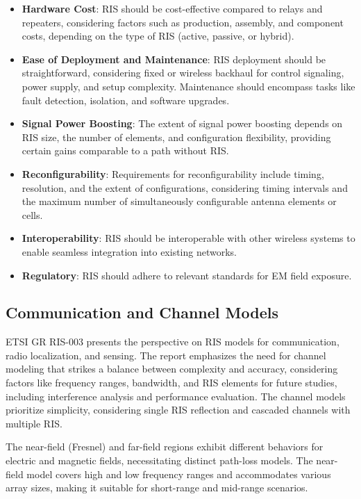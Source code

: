\documentclass[lettersize,journal]{IEEEtran}
\begin{document}
\begin{itemize}
\item {\bf Hardware Cost}: RIS should be cost-effective compared to relays and repeaters, considering factors such as production, assembly, and component costs, depending on the type of RIS (active, passive, or hybrid).

\item {\bf Ease of Deployment and Maintenance}: RIS deployment should be straightforward, considering fixed or wireless backhaul for control signaling, power supply, and setup complexity. Maintenance should encompass tasks like fault detection, isolation, and software upgrades.

\item {\bf Signal Power Boosting}: The extent of signal power boosting depends on RIS size, the number of elements, and configuration flexibility, providing certain gains comparable to a path without RIS.

\item {\bf Reconfigurability}: Requirements for reconfigurability include timing, resolution, and the extent of configurations, considering timing intervals and the maximum number of simultaneously configurable antenna elements or cells.

\item {\bf Interoperability}: RIS should be interoperable with other wireless systems to enable seamless integration into existing networks.

\item {\bf Regulatory}: RIS should adhere to relevant standards for EM field exposure.
\end{itemize}


\subsection{Communication and Channel Models}

ETSI GR RIS-003 \cite{ETSI-GR-RIS-003} presents the perspective on RIS models for communication, radio localization, and sensing. The report emphasizes the need for channel modeling that strikes a balance between complexity and accuracy, considering factors like frequency ranges, bandwidth, and RIS elements for future studies, including interference analysis and performance evaluation. The channel models prioritize simplicity, considering single RIS reflection and cascaded channels with multiple RIS.

The near-field (Fresnel) and far-field regions exhibit different behaviors for electric and magnetic fields, necessitating distinct path-loss models. The near-field model covers high and low frequency ranges and accommodates various array sizes, making it suitable for short-range and mid-range scenarios.
\end{document}
